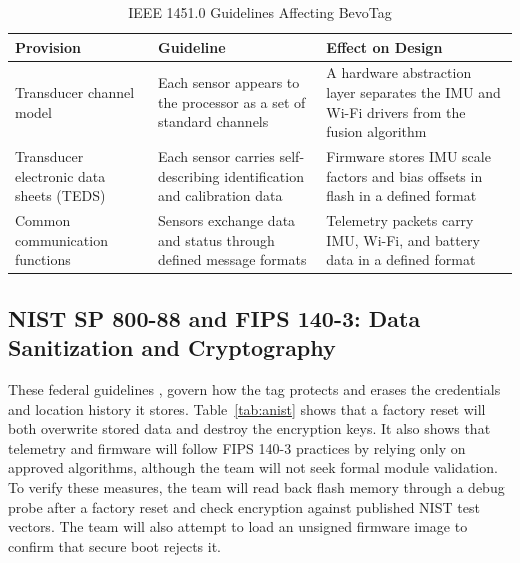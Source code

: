 \documentclass[12pt,letterpaper]{article}
\newenvironment{spectable}{\setstretch{1.0}\renewcommand{\arraystretch}{1.1}}{}
\begin{document}
\begin{table}[H]
\caption{IEEE 1451.0 Guidelines Affecting BevoTag}
\label{tab:a1451}
\centering
\begin{spectable}
\begin{tabularx}{\linewidth}{@{}L{1.7in} Y Y@{}}
\toprule
\textbf{Provision} & \textbf{Guideline} & \textbf{Effect on Design} \\
\midrule
Transducer channel model & Each sensor appears to the processor as a set of standard channels & A hardware abstraction layer separates the IMU and Wi-Fi drivers from the fusion algorithm \\
Transducer electronic data sheets (TEDS) & Each sensor carries self-describing identification and calibration data & Firmware stores IMU scale factors and bias offsets in flash in a defined format \\
Common communication functions & Sensors exchange data and status through defined message formats & Telemetry packets carry IMU, Wi-Fi, and battery data in a defined format \\
\bottomrule
\end{tabularx}
\end{spectable}
\end{table}

\subsection{NIST SP 800-88 and FIPS 140-3: Data Sanitization and Cryptography}
These federal guidelines \cite{nist80088}, \cite{fips1403} govern how the tag protects and erases
the credentials and location history it stores. Table~\ref{tab:anist} shows
that a factory reset will both overwrite stored data and destroy the encryption keys. It also shows
that telemetry and firmware will follow FIPS 140-3 practices by relying only on approved
algorithms, although the team will not seek formal module validation. To verify these measures, the
team will read back flash memory through a debug probe after a factory reset and check encryption
against published NIST test vectors. The team will also attempt to load an unsigned firmware image
to confirm that secure boot rejects it.
\end{document}
